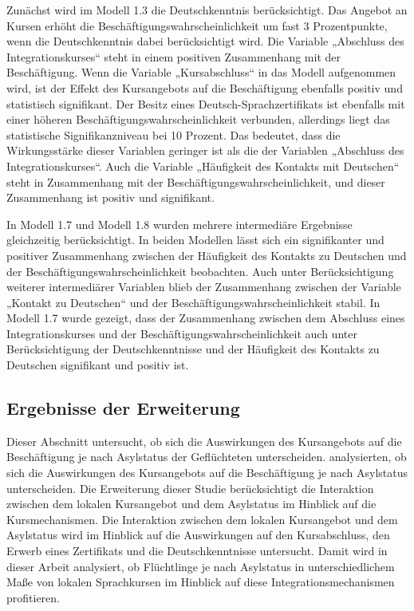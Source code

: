Zunächst wird im Modell 1.3 die Deutschkenntnis berücksichtigt. Das Angebot an Kursen erhöht die Beschäftigungswahrscheinlichkeit um fast 3 Prozentpunkte, wenn die Deutschkenntnis dabei berücksichtigt wird. Die Variable „Abschluss des Integrationskurses“ steht in einem positiven Zusammenhang mit der Beschäftigung. Wenn die Variable „Kursabschluss“ in das Modell aufgenommen wird, ist der Effekt des Kursangebots auf die Beschäftigung ebenfalls positiv und statistisch signifikant. Der Besitz eines Deutsch-Sprachzertifikats ist ebenfalls mit einer höheren Beschäftigungswahrscheinlichkeit verbunden, allerdings liegt das statistische Signifikanzniveau bei 10 Prozent. Das bedeutet, dass die Wirkungsstärke dieser Variablen geringer ist als die der Variablen „Abschluss des Integrationskurses“. Auch die Variable „Häufigkeit des Kontakts mit Deutschen“ steht in Zusammenhang mit der Beschäftigungswahrscheinlichkeit, und dieser Zusammenhang ist positiv und signifikant.

In Modell 1.7 und Modell 1.8 wurden mehrere intermediäre Ergebnisse gleichzeitig berücksichtigt. In beiden Modellen lässt sich ein signifikanter und positiver Zusammenhang zwischen der Häufigkeit des Kontakts zu Deutschen und der Beschäftigungswahrscheinlichkeit beobachten. Auch unter Berücksichtigung weiterer intermediärer Variablen blieb der Zusammenhang zwischen der Variable „Kontakt zu Deutschen“ und der Beschäftigungswahrscheinlichkeit stabil. In Modell 1.7 wurde gezeigt, dass der Zusammenhang zwischen dem Abschluss eines Integrationskurses und der Beschäftigungswahrscheinlichkeit auch unter Berücksichtigung der Deutschkenntnisse und der Häufigkeit des Kontakts zu Deutschen signifikant und positiv ist.









\subsection{Ergebnisse der Erweiterung}
\label{sec:erg-erweiterung}

Dieser Abschnitt untersucht, ob sich die Auswirkungen des Kursangebots auf die Beschäftigung je nach Asylstatus der Geflüchteten unterscheiden. \textcite{Kanas:2023} analysierten, ob sich die Auswirkungen des Kursangebots auf die Beschäftigung je nach Asylstatus unterscheiden. Die Erweiterung dieser Studie berücksichtigt die Interaktion zwischen dem lokalen Kursangebot und dem Asylstatus im Hinblick auf die Kursmechanismen. Die Interaktion zwischen dem lokalen Kursangebot und dem Asylstatus wird im Hinblick auf die Auswirkungen auf den Kursabschluss, den Erwerb eines Zertifikats und die Deutschkenntnisse untersucht. Damit wird in dieser Arbeit analysiert, ob Flüchtlinge je nach Asylstatus in unterschiedlichem Maße von lokalen Sprachkursen im Hinblick auf diese Integrationsmechanismen profitieren.

